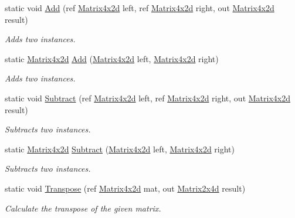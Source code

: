 \begin{DoxyCompactItemize}
static void \hyperlink{struct_open_t_k_1_1_matrix4x2d_afb94e21e7c67cdfd1c2e96d300e11c81}{Add} (ref \hyperlink{struct_open_t_k_1_1_matrix4x2d}{Matrix4x2d} left, ref \hyperlink{struct_open_t_k_1_1_matrix4x2d}{Matrix4x2d} right, out \hyperlink{struct_open_t_k_1_1_matrix4x2d}{Matrix4x2d} result)
\begin{DoxyCompactList}\small\item\em Adds two instances. \end{DoxyCompactList}\item 
static \hyperlink{struct_open_t_k_1_1_matrix4x2d}{Matrix4x2d} \hyperlink{struct_open_t_k_1_1_matrix4x2d_a459909cd5426e547eeb68edbabdb4efc}{Add} (\hyperlink{struct_open_t_k_1_1_matrix4x2d}{Matrix4x2d} left, \hyperlink{struct_open_t_k_1_1_matrix4x2d}{Matrix4x2d} right)
\begin{DoxyCompactList}\small\item\em Adds two instances. \end{DoxyCompactList}\item 
static void \hyperlink{struct_open_t_k_1_1_matrix4x2d_ac980c6ba2e623e72e6cdbf22d6a15264}{Subtract} (ref \hyperlink{struct_open_t_k_1_1_matrix4x2d}{Matrix4x2d} left, ref \hyperlink{struct_open_t_k_1_1_matrix4x2d}{Matrix4x2d} right, out \hyperlink{struct_open_t_k_1_1_matrix4x2d}{Matrix4x2d} result)
\begin{DoxyCompactList}\small\item\em Subtracts two instances. \end{DoxyCompactList}\item 
static \hyperlink{struct_open_t_k_1_1_matrix4x2d}{Matrix4x2d} \hyperlink{struct_open_t_k_1_1_matrix4x2d_acf78935a6b007e0c13677663097cbfd1}{Subtract} (\hyperlink{struct_open_t_k_1_1_matrix4x2d}{Matrix4x2d} left, \hyperlink{struct_open_t_k_1_1_matrix4x2d}{Matrix4x2d} right)
\begin{DoxyCompactList}\small\item\em Subtracts two instances. \end{DoxyCompactList}\item 
static void \hyperlink{struct_open_t_k_1_1_matrix4x2d_a0ba563733d2260f6a79ac25f95ea861d}{Transpose} (ref \hyperlink{struct_open_t_k_1_1_matrix4x2d}{Matrix4x2d} mat, out \hyperlink{struct_open_t_k_1_1_matrix2x4d}{Matrix2x4d} result)
\begin{DoxyCompactList}\small\item\em Calculate the transpose of the given matrix. \end{DoxyCompactList}\item 

\end{DoxyCompactItemize}
